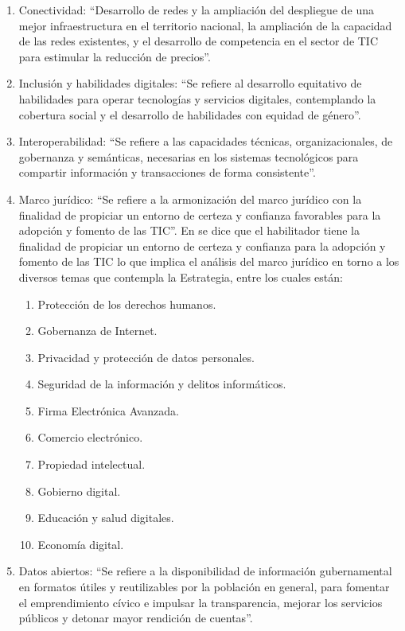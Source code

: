 \documentclass[runningheads,a4paper]{llncs}
\begin{document}
\begin{enumerate}
	\item Conectividad: ``Desarrollo de redes y la ampliación del despliegue de una mejor infraestructura en el territorio nacional, la ampliación de la capacidad de las redes existentes, y el desarrollo de competencia en el sector de \gls{TIC} para estimular la reducción de precios''.\\
	\item Inclusión y habilidades digitales: ``Se refiere al desarrollo equitativo de habilidades para operar
tecnologías y servicios digitales, contemplando la cobertura social y el desarrollo de habilidades con equidad de género''.\\
	\item Interoperabilidad: ``Se refiere a las capacidades técnicas, organizacionales, de gobernanza y semánticas, necesarias en los sistemas tecnológicos para compartir información y transacciones de forma
consistente''.\\
	\item Marco jurídico: ``Se refiere a la armonización del marco jurídico con la finalidad de propiciar un entorno de certeza y confianza favorables para la adopción y fomento de las \gls{TIC}''. En \cite{EDN_1} se dice que el habilitador tiene la finalidad de propiciar un entorno de certeza y confianza para la adopción y fomento de las \gls{TIC} lo que implica el análisis del marco jurídico en torno a los diversos temas que contempla la Estrategia, entre los cuales están:\\
	\begin{enumerate}
		\item Protección de los derechos humanos.
		\item Gobernanza de Internet.
		\item Privacidad y protección de datos personales.
		\item Seguridad de la información y delitos informáticos.
		\item Firma Electrónica Avanzada.
		\item Comercio electrónico.
		\item Propiedad intelectual.
		\item Gobierno digital.
		\item Educación y salud digitales.
		\item Economía digital.\\
	\end{enumerate}
	
	\item Datos abiertos: ``Se refiere a la disponibilidad de información gubernamental en formatos útiles y reutilizables por la población en general, para fomentar el emprendimiento cívico e impulsar la transparencia, mejorar los servicios públicos y detonar mayor rendición de cuentas''.
\end{enumerate}  
\end{document}
